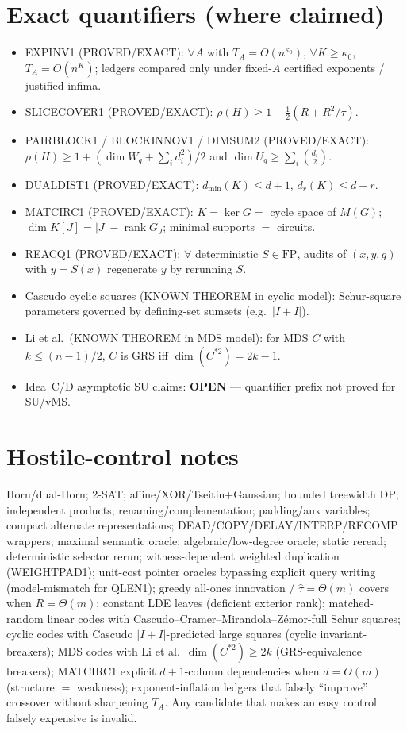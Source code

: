 \documentclass[11pt]{article}
\begin{document}
\section*{Exact quantifiers (where claimed)}
\begin{itemize}
\item EXPINV1 (PROVED/EXACT): $\forall A$ with $T_A=O(n^{\kappa_0})$, $\forall K\ge\kappa_0$,
$T_A=O(n^K)$; ledgers compared only under fixed-$A$ certified exponents / justified infima.
\item SLICECOVER1 (PROVED/EXACT): $\rho(H)\ge 1+\tfrac12(R+R^2/\tau)$.
\item PAIRBLOCK1 / BLOCKINNOV1 / DIMSUM2 (PROVED/EXACT):
$\rho(H)\ge 1+(\dim W_q+\sum_i d_i^2)/2$ and $\dim U_q\ge\sum_i\binom{d_i}{2}$.
\item DUALDIST1 (PROVED/EXACT): $d_{\min}(K)\le d+1$, $d_r(K)\le d+r$.
\item MATCIRC1 (PROVED/EXACT): $K=\ker G=$ cycle space of $M(G)$;
$\dim K[J]=|J|-\operatorname{rank}G_J$; minimal supports $=$ circuits.
\item REACQ1 (PROVED/EXACT): $\forall$ deterministic $S\in\mathrm{FP}$, audits of $(x,y,g)$
with $y=S(x)$ regenerate $y$ by rerunning $S$.
\item Cascudo cyclic squares (KNOWN THEOREM in cyclic model): Schur-square parameters governed
by defining-set sumsets (e.g.\ $|I+I|$).
\item Li et al.\ (KNOWN THEOREM in MDS model): for MDS $C$ with $k\le(n-1)/2$,
$C$ is GRS iff $\dim(C^{*2})=2k-1$.
\item Idea~C/D asymptotic SU claims: \textbf{OPEN} --- quantifier prefix not proved for SU/vMS.
\end{itemize}

\section*{Hostile-control notes}
Horn/dual-Horn; 2-SAT; affine/XOR/Tseitin+Gaussian; bounded treewidth DP; independent products;
renaming/complementation; padding/aux variables; compact alternate representations;
DEAD/COPY/DELAY/INTERP/RECOMP wrappers; maximal semantic oracle; algebraic/low-degree oracle;
static reread; deterministic selector rerun; witness-dependent weighted duplication (WEIGHTPAD1);
unit-cost pointer oracles bypassing explicit query writing (model-mismatch for QLEN1);
greedy all-ones innovation / $\widehat\tau=\Theta(m)$ covers when $R=\Theta(m)$;
constant LDE leaves (deficient exterior rank);
matched-random linear codes with Cascudo--Cramer--Mirandola--Z\'emor-full Schur squares;
cyclic codes with Cascudo $|I+I|$-predicted large squares (cyclic invariant-breakers);
MDS codes with Li et al.\ $\dim(C^{*2})\ge 2k$ (GRS-equivalence breakers);
MATCIRC1 explicit $d+1$-column dependencies when $d=O(m)$ (structure $=$ weakness);
exponent-inflation ledgers that falsely ``improve'' crossover without sharpening $T_A$.
Any candidate that makes an easy control falsely expensive is invalid.
\end{document}
